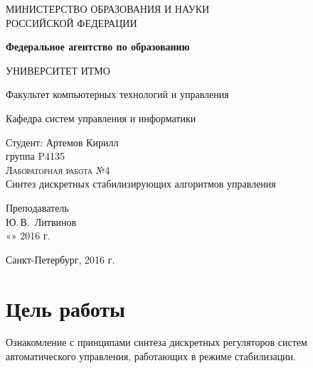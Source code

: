 \documentclass[a4paper,14pt]{extreport}
\begin{document}
	
	\begin{titlepage}
		\begin{center}
			\large
			МИНИСТЕРСТВО ОБРАЗОВАНИЯ И НАУКИ\\ РОССИЙСКОЙ ФЕДЕРАЦИИ
			
			\textbf{Федеральное агентство по образованию}
			\vspace{0.5cm}
			
			УНИВЕРСИТЕТ ИТМО
			\vspace{0.25cm}
			
			Факультет компьютерных технологий и управления
			
			Кафедра систем управления и информатики
			\vfill
			
			
			Студент: Артемов Кирилл\\
			группа P4135\\
			
			\textsc{Лабораторная работа №4}\\[5mm]
			
			{\LARGE Синтез дискретных стабилизирующих алгоритмов управления}
			\bigskip
			
		\end{center}
		\vfill
		
		\newlength{\ML}
		\hfill\begin{minipage}{0.4\textwidth}
			Преподаватель\\
			\underline{\hspace{\ML}} Ю.\,В.~Литвинов\\
			«\underline{\hspace{0.7cm}}» \underline{\hspace{2cm}} 2016 г.
		\end{minipage}%
		\bigskip
		
		\vfill
		
		\begin{center}
			Санкт-Петербург, 2016 г.
		\end{center}
	\end{titlepage}
\newpage

\section{Цель работы}

Ознакомление с принципами синтеза дискретных регуляторов систем автоматического управления, работающих в режиме стабилизации.
\end{document}
